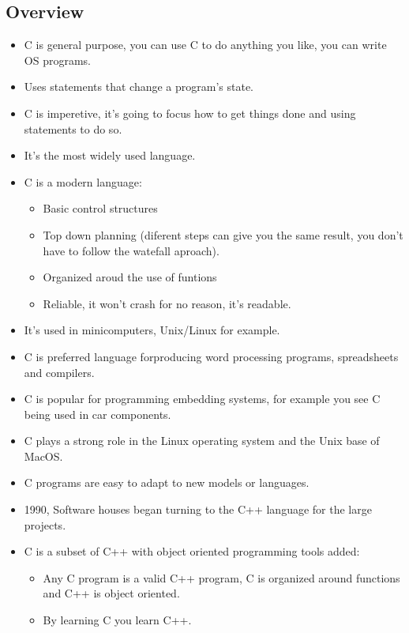 \subsection{Overview}
\begin{itemize}
    \item C is general purpose, you can use C to do anything you like, you can write OS programs.
    \item Uses statements that change a program's state.
    \item C is imperetive, it's going to focus how to get things done and using statements to do so.
    \item It's the most widely used language.
    \item C is a modern language:
        \begin{itemize}
            \item Basic control structures
            \item Top down planning (diferent steps can give you the same result, you don't have to follow the watefall aproach).
            \item Organized aroud the use of funtions
            \item Reliable, it won't crash for no reason, it's readable.
        \end{itemize}
    
    \item It's used in minicomputers, Unix/Linux for example.
    \item C is preferred language forproducing word processing programs, spreadsheets and compilers.
    \item C is popular for programming embedding systems, for example you see C being used in car components.
    \item C plays a strong role in the Linux operating system and the Unix base of MacOS.
    \item  C programs are easy to adapt to new models or languages.
    \item 1990, Software houses began turning to the C++ language for the large projects.
    \item C is a subset of C++ with object oriented programming tools added:
        \begin{itemize}
            \item Any C program is a valid C++ program, C is organized around functions and C++ is object oriented.
            \item By learning C you learn C++.
        \end{itemize}
    

\end{itemize}
